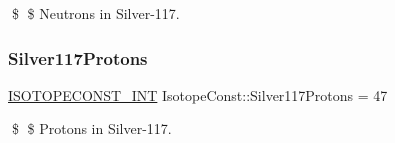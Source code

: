 \$ \$ Neutrons in Silver-\/117. \mbox{\label{group___isotope_const-_silver-_ag117_gaae5119ff7e534c0caa75e6166185b1e5}} 
\subsubsection{\texorpdfstring{Silver117\+Protons}{Silver117Protons}}
{\footnotesize\ttfamily \mbox{\hyperlink{group___isotope_const-_macros_ga5f18360b3e99483a35c32d789e62621c}{I\+S\+O\+T\+O\+P\+E\+C\+O\+N\+S\+T\+\_\+\+I\+NT}} Isotope\+Const\+::\+Silver117\+Protons = 47}

\$ \$ Protons in Silver-\/117. 